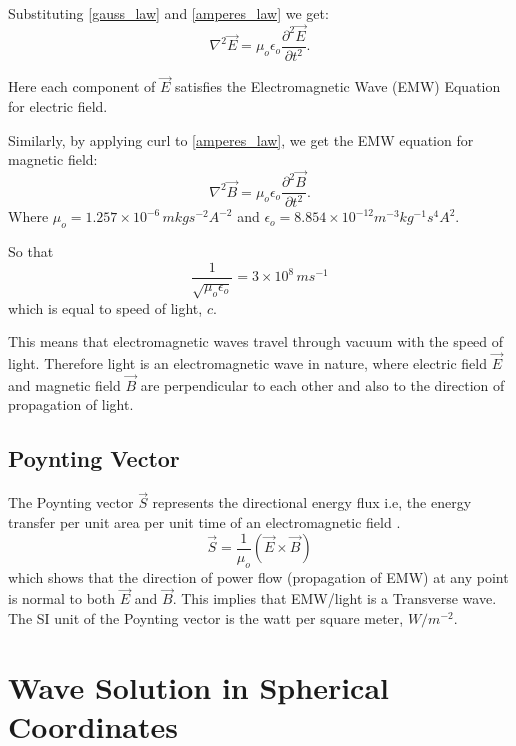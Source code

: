 Substituting \eqref{gauss_law} and \eqref{amperes_law} we get:
%
   \begin{equation}
   \nabla^2\vec{E} =  \mu_{o}\epsilon_{o}\frac{\partial^2\vec{E}}{\partial t^2}.
   \end{equation}

Here each component of $\vec{E}$ satisfies the Electromagnetic Wave (EMW) Equation for electric field.

Similarly, by applying curl to \eqref{amperes_law}, we get the EMW equation for magnetic field:
%
   \begin{equation}
   \nabla^2\vec{B} =  \mu_{o}\epsilon_{o}\frac{\partial^2\vec{B}}{\partial t^2}.
   \end{equation}
%
Where $\mu_{o} = 1.257\times10^{-6} \, m kg s^{-2} A^{-2}$ and $\epsilon_{o} = 8.854 \times 10^{-12} m^{-3} kg^{-1} s^4 A^2$.

So that
%
   \begin{equation}
   \frac{1}{\sqrt{\mu_{o}\epsilon_{o}}} = 3\times10^8 \, ms^{-1}
   \end{equation}
%
which is equal to speed of light, $c$.

This means that electromagnetic waves travel through vacuum with the speed of light. Therefore light is an electromagnetic wave in nature, where electric field $\vec{E}$ and magnetic field $\vec{B}$ are perpendicular to each other and also to the direction of propagation of light.


\subsection{Poynting Vector}

The Poynting vector $\vec{S}$ represents the directional energy flux i.e, the energy transfer per unit area per unit time of an electromagnetic field \cite{wang1986electromagnetic}.
%
   \begin{equation}\label{eqn:poynting}
      \vec{S} = \frac{1}{\mu_{o}}(\vec{E}\times\vec{B})
   \end{equation}
%
which shows that the direction of power flow (propagation of EMW) at any point is normal to both $\vec{E}$ and $\vec{B}$. This implies that EMW/light is a Transverse wave. The SI unit of the Poynting vector is the watt per square meter, $W/m^{-2}$.


\section{Wave Solution in Spherical Coordinates}

